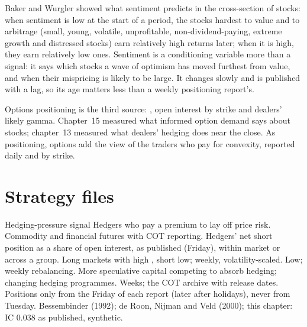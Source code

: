 Baker and Wurgler showed what sentiment predicts in the cross-section of stocks: when sentiment is low at the start of a period, the stocks hardest to
value and to arbitrage (small, young, volatile, unprofitable, non-dividend-paying, extreme growth and distressed stocks) earn relatively high returns
later; when it is high, they earn relatively low ones. Sentiment is a conditioning variable more than a signal: it says which stocks a wave of
optimism has moved furthest from value, and when their mispricing is likely to be large. It changes slowly and is published with a lag, so its age
matters less than a weekly positioning report's.

Options positioning is the third source: , open interest by strike and dealers' likely gamma. Chapter~15 measured what informed option
demand says about stocks; chapter~13 measured what dealers' hedging does near the close. As positioning, options add the view of the traders who pay
for convexity, reported daily and by strike.

\section{Strategy files}

\begin{strategyfile}{Hedging-pressure signal}\label{strat:s1:positioning-and-sentiment:hedging}
 Hedgers who pay a premium to lay off price risk.
 Commodity and financial futures with COT reporting.
 Hedgers' net short position as a share of open interest, as published (Friday), within market or across a group.
 Long markets with high , short low; weekly, volatility-scaled.
 Low; weekly rebalancing.
 More speculative capital competing to absorb hedging; changing hedging programmes.
 Weeks; the COT archive with release dates.
 Positions only from the Friday of each report (later after holidays), never from Tuesday.
 Bessembinder (1992); de Roon, Nijman and Veld (2000); this chapter: IC 0.038 as published, synthetic.
\end{strategyfile}

